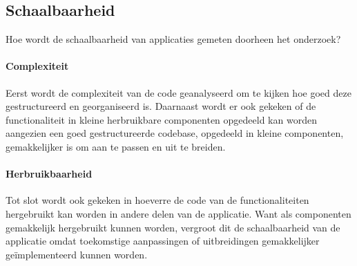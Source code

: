 \subsection{Schaalbaarheid}
Hoe wordt de schaalbaarheid van applicaties gemeten doorheen het onderzoek?

\paragraph{Complexiteit}
Eerst wordt de complexiteit van de code geanalyseerd om te kijken hoe goed deze 
gestructureerd en georganiseerd is. Daarnaast wordt er ook gekeken of de 
functionaliteit in kleine herbruikbare componenten opgedeeld kan worden aangezien een 
goed gestructureerde codebase, opgedeeld in kleine componenten, gemakkelijker 
is om aan te passen en uit te breiden.

\paragraph{Herbruikbaarheid}
Tot slot wordt ook gekeken in hoeverre de code van de functionaliteiten hergebruikt kan 
worden in andere delen van de applicatie. Want als componenten gemakkelijk hergebruikt 
kunnen worden, vergroot dit de schaalbaarheid van de applicatie omdat 
toekomstige aanpassingen of uitbreidingen gemakkelijker geïmplementeerd kunnen worden.
